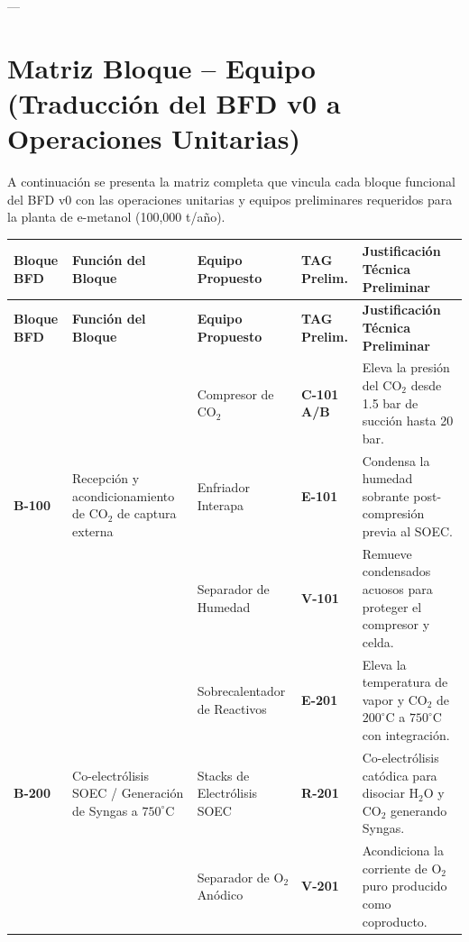 \documentclass[11pt,letterpaper]{article}
\newcommand{\tagbox}[1]{\textbf{\color{SolvantaNavy}#1}}
\begin{document}
---

\section{Matriz Bloque -- Equipo (Traducción del BFD v0 a Operaciones Unitarias)}

A continuación se presenta la matriz completa que vincula cada bloque funcional del BFD v0 con las operaciones unitarias y equipos preliminares requeridos para la planta de e-metanol (100,000 t/año).

\begin{longtable}{|p{1.4cm}|p{3.2cm}|p{3.0cm}|p{1.6cm}|p{4.8cm}|}
    \hline
    \rowcolor{SolvantaNavy}
    \textbf{\color{white}Bloque BFD} & \textbf{\color{white}Función del Bloque} & \textbf{\color{white}Equipo Propuesto} & \textbf{\color{white}TAG Prelim.} & \textbf{\color{white}Justificación Técnica Preliminar} \\
    \hline
    \endfirsthead
    \hline
    \rowcolor{SolvantaNavy}
    \textbf{\color{white}Bloque BFD} & \textbf{\color{white}Función del Bloque} & \textbf{\color{white}Equipo Propuesto} & \textbf{\color{white}TAG Prelim.} & \textbf{\color{white}Justificación Técnica Preliminar} \\
    \hline
    \endhead

    \multirow{3}{*}{\textbf{B-100}} & \multirow{3}{=}{Recepción y acondicionamiento de $\text{CO}_2$ de captura externa} & Compresor de $\text{CO}_2$ & \tagbox{C-101 A/B} & Eleva la presión del $\text{CO}_2$ desde 1.5 bar de succión hasta 20 bar. \\ \cline{3-5}
     & & Enfriador Interapa & \tagbox{E-101} & Condensa la humedad sobrante post-compresión previa al SOEC. \\ \cline{3-5}
     & & Separador de Humedad & \tagbox{V-101} & Remueve condensados acuosos para proteger el compresor y celda. \\ \hline

    \multirow{3}{*}{\textbf{B-200}} & \multirow{3}{=}{Co-electrólisis SOEC / Generación de Syngas a $750^\circ\text{C}$} & Sobrecalentador de Reactivos & \tagbox{E-201} & Eleva la temperatura de vapor y $\text{CO}_2$ de $200^\circ\text{C}$ a $750^\circ\text{C}$ con integración. \\ \cline{3-5}
     & & Stacks de Electrólisis SOEC & \tagbox{R-201} & Co-electrólisis catódica para disociar $\text{H}_2\text{O}$ y $\text{CO}_2$ generando Syngas. \\ \cline{3-5}
     & & Separador de $\text{O}_2$ Anódico & \tagbox{V-201} & Acondiciona la corriente de $\text{O}_2$ puro producido como coproducto. \\ \hline


\end{longtable}
\end{document}
